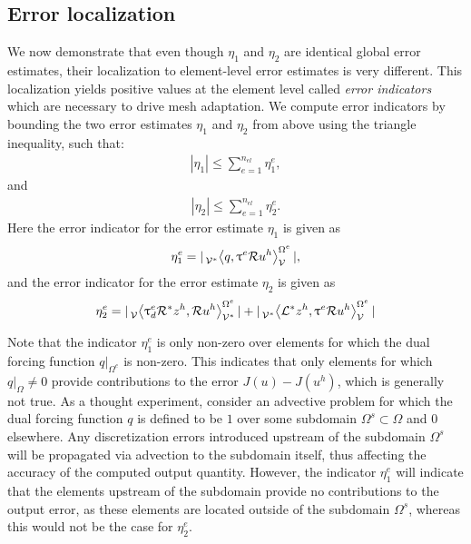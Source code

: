 \subsection{Error localization}

We now demonstrate that even though $\eta_1$ and
$\eta_2$ are identical global error estimates,
their localization to element-level error estimates
is very different. This localization yields positive
values at the element level called \emph{error indicators}
which are necessary to drive mesh adaptation.
We compute error indicators by bounding the
two error estimates $\eta_1$ and $\eta_2$ from
above using the triangle inequality, such that:
%
\begin{gather}
| \eta_1  | \leq  \sum_{e=1}^{n_{el}} \eta_1^e,
\end{gather}
%
and
%
\begin{gather}
| \eta_2 | \leq \sum_{e=1}^{n_{el}} \eta_2^e.
\end{gather}
%
Here the error indicator for the error estimate
$\eta_1$ is given as
%
\begin{gather}
\eta_1^e = | \,{}_{\mathcal{V}^*}^{}\!\left< {q}, {\uptau^e \mathcal{R} u^h} \right>_{\mathcal{V}}^{\Omega^e} |,
\end{gather}
%
and the error indicator for the error estimate
$\eta_2$ is given as
%
\begin{gather}
\eta_2^e = | \,{}_{\mathcal{V}}^{}\!\left< {\uptau^e_d \mathcal{R}^* z^h}, {\mathcal{R} u^h} \right>_{\mathcal{V}^*}^{\Omega^e} | +
| \,{}_{\mathcal{V}^*}^{}\!\left< {\mathcal{L}^* z^h}, {\uptau^e \mathcal{R} u^h} \right>_{\mathcal{V}}^{\Omega^e} |
\end{gather}

Note that the indicator $\eta^e_1$ is only non-zero
over elements for which the dual forcing function
$q | _{\Omega^e}$ is non-zero. This indicates that only
elements for which $q|_{\Omega} \neq 0$ provide
contributions to the error $J(u) - J(u^h)$, which is
generally not true. As a thought experiment,
consider an advective problem
for which the dual forcing function $q$ is defined to be
$1$ over some subdomain $\Omega^s \subset \Omega$
and $0$ elsewhere. Any discretization errors
introduced upstream of the subdomain $\Omega^s$
will be propagated via advection to the subdomain
itself, thus affecting the accuracy of the computed
output quantity. However, the indicator $\eta^e_1$
will indicate that the elements upstream of the
subdomain provide no contributions to the output
error, as these elements are located outside of
the subdomain $\Omega^s$, whereas this would not
be the case for $\eta^e_2$.

